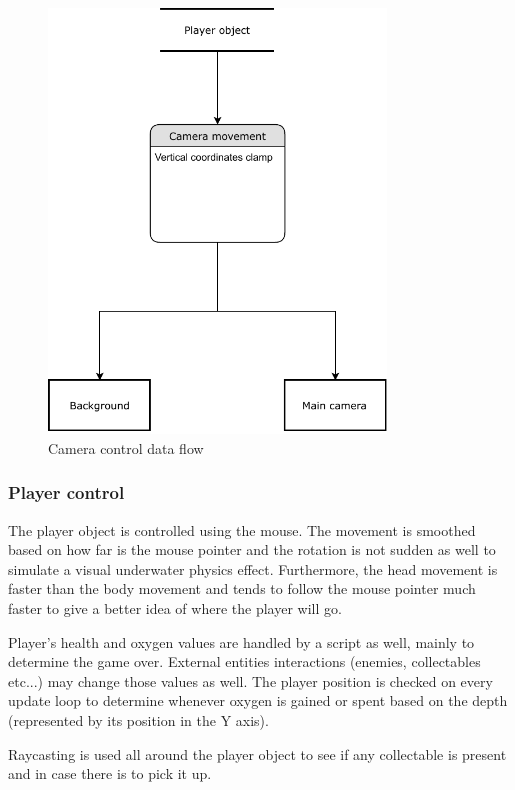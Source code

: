 \documentclass[11pt]{article}
\begin{document}
\begin{figure}[H]
  \centering
  \includegraphics[width=0.8\textwidth]{figures/camera_controller}
  \caption{Camera control data flow}
\end{figure}

\subsubsection{Player control}
The player object is controlled using the mouse. The movement is smoothed based on how far is the mouse pointer and the rotation is not sudden as well to simulate a visual underwater physics effect. Furthermore, the head movement is faster than the body movement and tends to follow the mouse pointer much faster to give a better idea of where the player will go.

Player's health and oxygen values are handled by a script as well, mainly to determine the game over. External entities interactions (enemies, collectables etc...) may change those values as well.
The player position is checked on every update loop to determine whenever oxygen is gained or spent based on the depth (represented by its position in the Y axis).

Raycasting is used all around the player object to see if any collectable is present and in case there is to pick it up.
\end{document}
